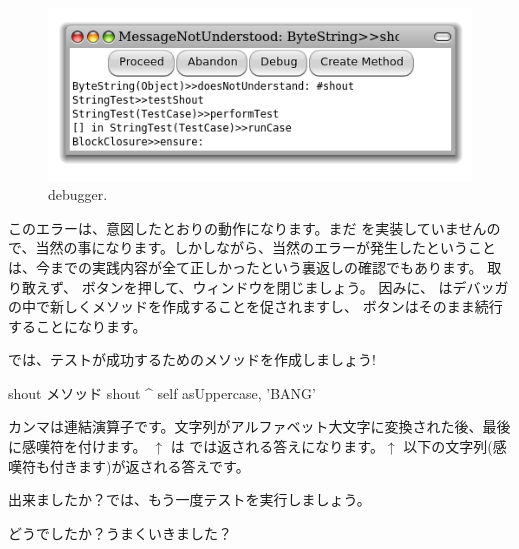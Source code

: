 \documentclass[a4paper,10pt,twoside]{book}
\begin{document}
\begin{figure}[hbt]
\centerline {\includegraphics[width=\textwidth]{Predebugger}}
\caption{debugger.}
\end{figure}

このエラーは、意図したとおりの動作になります。まだ  を実装していませんので、当然の事になります。しかしながら、当然のエラーが発生したということは、今までの実践内容が全て正しかったという裏返しの確認でもあります。
取り敢えず、 ボタンを押して、ウィンドウを閉じましょう。
因みに、 はデバッガの中で新しくメソッドを作成することを促されますし、 ボタンはそのまま続行することになります。

では、テストが成功するためのメソッドを作成しましょう!

\begin{method}[shout]{shout メソッド}
shout
	^ self asUppercase, 'BANG'
\end{method}

カンマは連結演算子です。文字列がアルファベット大文字に変換された後、最後に感嘆符を付けます。
$\uparrow$ は \pharo では返される答えになります。$\uparrow$ 以下の文字列(感嘆符も付きます)が返される答えです。

出来ましたか？では、もう一度テストを実行しましょう。

どうでしたか？うまくいきました？

\end{document}
